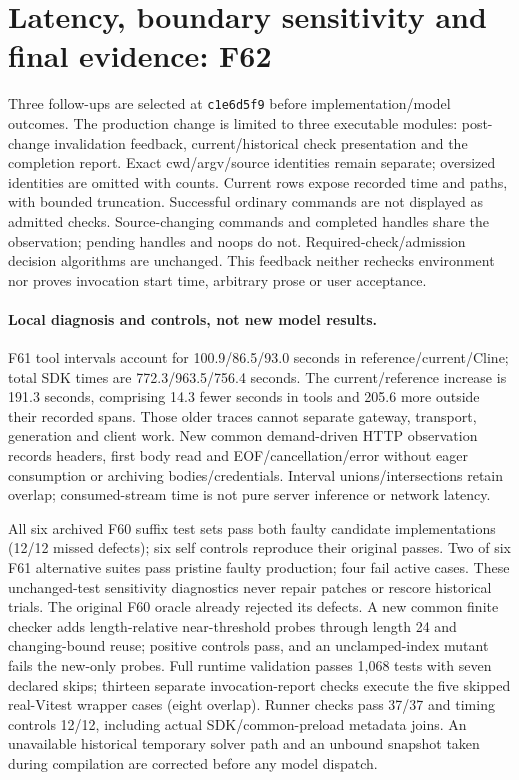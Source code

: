 \documentclass[11pt,a4paper]{article}
\begin{document}
\section{Latency, boundary sensitivity and final evidence: F62}
Three follow-ups are selected at \texttt{c1e6d5f9} before implementation/model
outcomes. The production change is limited to three executable modules:
post-change invalidation feedback, current/historical check presentation and the
completion report. Exact cwd/argv/source identities remain separate; oversized
identities are omitted with counts. Current rows expose recorded time and paths,
with bounded truncation. Successful ordinary commands are not displayed as
admitted checks. Source-changing commands and completed handles share the
observation; pending handles and noops do not. Required-check/admission decision
algorithms are unchanged. This feedback neither rechecks environment nor proves
invocation start time, arbitrary prose or user acceptance.

\paragraph{Local diagnosis and controls, not new model results.}
F61 tool intervals account for 100.9/86.5/93.0 seconds in reference/current/Cline;
total SDK times are 772.3/963.5/756.4 seconds. The current/reference increase is
191.3 seconds, comprising 14.3 fewer seconds in tools and 205.6 more outside
their recorded spans. Those older traces cannot separate gateway, transport,
generation and client work. New common demand-driven HTTP observation records
headers, first body read and EOF/cancellation/error without eager consumption or
archiving bodies/credentials. Interval unions/intersections retain overlap;
consumed-stream time is not pure server inference or network latency.

All six archived F60 suffix test sets pass both faulty candidate implementations
(12/12 missed defects); six self controls reproduce their original passes. Two
of six F61 alternative suites pass pristine faulty production; four fail active
cases. These unchanged-test sensitivity diagnostics never repair patches or
rescore historical trials. The original F60 oracle already rejected its defects.
A new common finite checker adds length-relative near-threshold probes through
length 24 and changing-bound reuse; positive controls pass, and an unclamped-index
mutant fails the new-only probes. Full runtime validation passes 1,068 tests with
seven declared skips; thirteen separate invocation-report checks execute the
five skipped real-Vitest wrapper cases (eight overlap). Runner checks pass 37/37
and timing controls 12/12, including actual SDK/common-preload metadata joins.
An unavailable historical temporary solver path and an unbound snapshot taken
during compilation are corrected before any model dispatch.
\end{document}
